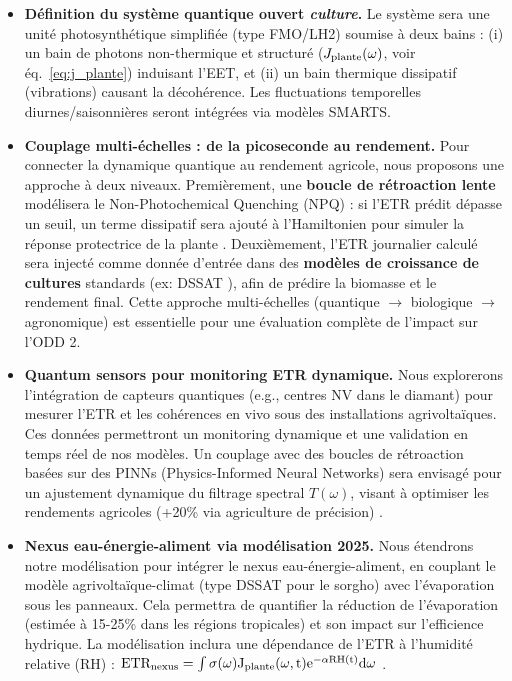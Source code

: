 \documentclass[12pt, a4paper]{article}
\begin{document}
\begin{itemize}
    \item \textbf{Définition du système quantique ouvert \textit{culture}.} Le système sera une unité photosynthétique simplifiée (type FMO/LH2) soumise à deux bains : (i) un bain de photons non-thermique et structuré ($J_{\rm plante}(\omega)$, voir éq.~\eqref{eq:j_plante}) induisant l'EET, et (ii) un bain thermique dissipatif (vibrations) causant la décohérence. Les fluctuations temporelles diurnes/saisonnières seront intégrées via modèles SMARTS.
    
    \item \textbf{Couplage multi-échelles : de la picoseconde au rendement.} Pour connecter la dynamique quantique au rendement agricole, nous proposons une approche à deux niveaux. Premièrement, une \textbf{boucle de rétroaction lente} modélisera le Non-Photochemical Quenching (NPQ) : si l'ETR prédit dépasse un seuil, un terme dissipatif sera ajouté à l'Hamiltonien pour simuler la réponse protectrice de la plante \cite{Muller2001}. Deuxièmement, l'ETR journalier calculé sera injecté comme donnée d'entrée dans des \textbf{modèles de croissance de cultures} standards (ex: DSSAT \cite{Jones2003}), afin de prédire la biomasse et le rendement final. Cette approche multi-échelles (quantique $\rightarrow$ biologique $\rightarrow$ agronomique) est essentielle pour une évaluation complète de l'impact sur l'ODD 2.

    \item \textbf{Quantum sensors pour monitoring ETR dynamique.} Nous explorerons l'intégration de capteurs quantiques (e.g., centres NV dans le diamant) pour mesurer l'ETR et les cohérences en vivo sous des installations agrivoltaïques. Ces données permettront un monitoring dynamique et une validation en temps réel de nos modèles. Un couplage avec des boucles de rétroaction basées sur des PINNs (Physics-Informed Neural Networks) sera envisagé pour un ajustement dynamique du filtrage spectral $T(\omega)$, visant à optimiser les rendements agricoles (+20\% via agriculture de précision) \cite{Farmonaut2025}.

    \item \textbf{Nexus eau-énergie-aliment via modélisation 2025.} Nous étendrons notre modélisation pour intégrer le nexus eau-énergie-aliment, en couplant le modèle agrivoltaïque-climat (type DSSAT pour le sorgho) avec l'évaporation sous les panneaux. Cela permettra de quantifier la réduction de l'évaporation (estimée à 15-25\% dans les régions tropicales) et son impact sur l'efficience hydrique. La modélisation inclura une dépendance de l'ETR à l'humidité relative (RH) : \( \rm ETR_{nexus} = \int \sigma(\omega) J_{\rm plante}(\omega,t) e^{-\alpha \rm RH(t)} d\omega \) \cite{Rapella2025}.
\end{itemize}
\end{document}
